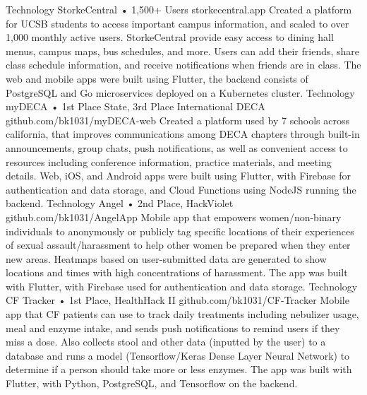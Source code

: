 \documentclass[9pt]{developercv} %
\begin{document}
\vspace{-18 pt}
\vspace{-4 pt}
\begin{entrylist}
    \vspace{-4 pt}
    \entry
		{Technology}
		{StorkeCentral • 1,500+ Users}
		{storkecentral.app}
		{
            Created a platform for UCSB students to access important campus information, and scaled to over 1,000 monthly active users.
            StorkeCentral provide easy access to dining hall menus, campus maps, bus schedules, and more.
            Users can add their friends, share class schedule information, and receive notifications when friends are in class.
            The web and mobile apps were built using Flutter, the backend consists of PostgreSQL and Go microservices deployed on a Kubernetes cluster.
        }
    \vspace{-4 pt}
    \entry
		{Technology}
		{myDECA • 1st Place State, 3rd Place International DECA}
		{github.com/bk1031/myDECA-web}
		{
            Created a platform used by 7 schools across california, that improves communications among DECA chapters through built-in announcements, group chats, push notifications, as well as convenient access to resources including conference information, practice materials, and meeting details.
            Web, iOS, and Android apps were built using Flutter, with Firebase for authentication and data storage, and Cloud Functions using NodeJS running the backend.
        }
    \vspace{-4 pt}
	\entry
		{Technology}
		{Angel • 2nd Place, HackViolet}
		{github.com/bk1031/AngelApp}
		{
            Mobile app that empowers women/non-binary individuals to anonymously or publicly tag specific locations of their experiences of sexual assault/harassment to help other women be prepared when they enter new areas.
            Heatmaps based on user-submitted data are generated to show locations and times with high concentrations of harassment.
            The app was built with Flutter, with Firebase used for authentication and data storage.
        }
    \vspace{-4 pt}
    \entry
		{Technology}
		{CF Tracker • 1st Place, HealthHack II}
		{github.com/bk1031/CF-Tracker}
		{
            Mobile app that CF patients can use to track daily treatments including nebulizer usage, meal and enzyme intake, and sends push notifications to remind users if they miss a dose.
            Also collects stool and other data (inputted by the user) to a database and runs a model (Tensorflow/Keras Dense Layer Neural Network) to determine if a person should take more or less enzymes.
            The app was built with Flutter, with Python, PostgreSQL, and Tensorflow on the backend.
        }
\end{entrylist}
\end{document}
